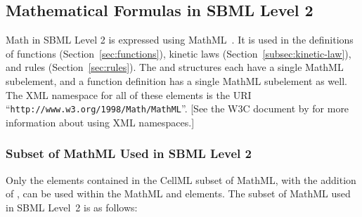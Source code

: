 \documentclass[10pt,twocolumntoc]{cekarticle}
\begin{document}
\subsection{Mathematical Formulas in SBML Level 2}
\label{sec:formulas}

Math in SBML Level 2 is expressed using MathML~\citep{w3c:2000b}.  It is
used in the definitions of functions (Section~\ref{sec:functions}), kinetic
laws (Section~\ref{subsec:kinetic-law}), and rules
(Section~\ref{sec:rules}).  The  and 
structures each have a single MathML  subelement, and a
function definition has a single MathML  subelement as well.
The XML namespace for all of these elements is the URI
``\texttt{http://www.w3.org/1998/Math/MathML}''.  [See the W3C document by
\citet{bray:1999} for more information about using XML namespaces.]

\subsubsection{Subset of MathML Used in SBML Level 2}

Only the elements contained in the CellML subset of MathML, with the
addition of , can be used within the MathML  and
 elements.  The subset of MathML used in SBML Level~2 is as
follows:
\end{document}
